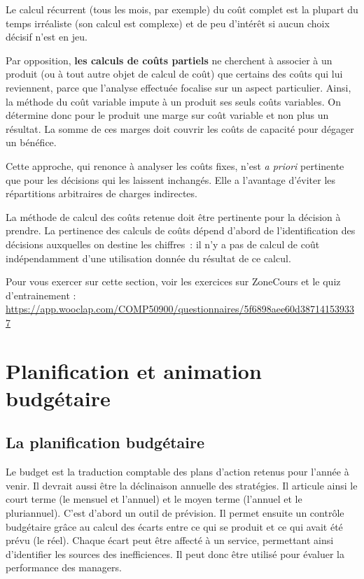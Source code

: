 \documentclass[oneside]{kaobook}
\begin{document}
Le calcul récurrent (tous les mois, par exemple) du coût complet est la plupart du temps irréaliste (son calcul est complexe) et de peu d'intérêt si aucun choix décisif n'est en jeu.

Par opposition, \textbf{les calculs de coûts partiels} ne cherchent à associer à un produit (ou à tout autre objet de calcul de coût) que certains des coûts qui lui reviennent, parce que l'analyse effectuée focalise sur un aspect particulier. Ainsi, la méthode du coût variable impute à un produit ses seuls coûts variables. On détermine donc pour le produit une marge sur coût variable et non plus un résultat. La somme de ces marges doit couvrir les coûts de capacité pour dégager un bénéfice.

Cette approche, qui renonce à analyser les coûts fixes, n'est \emph{a priori} pertinente que pour les décisions qui les laissent inchangés. Elle a l'avantage d'éviter les répartitions arbitraires de charges indirectes.

\begin{kaowarn}
La méthode de calcul des coûts retenue doit être pertinente pour la décision à prendre. La pertinence des calculs de coûts dépend d'abord de l'identification des décisions auxquelles on destine les chiffres : il n'y a pas de calcul de coût indépendamment d'une utilisation donnée du résultat de ce calcul.
\end{kaowarn}

\begin{kaobox}
Pour vous exercer sur cette section, voir les exercices sur ZoneCours et le quiz d'entrainement : \url{https://app.wooclap.com/COMP50900/questionnaires/5f6898aee60d387141539337}
\end{kaobox}

\chapter{Planification et animation budgétaire}
\label{sec:org8135c73}
\section{La planification budgétaire}
\label{sec:orge6d09b5}
Le budget est la traduction comptable des plans d'action retenus pour l'année à venir. Il devrait aussi être la déclinaison annuelle des stratégies. Il articule ainsi le court terme (le mensuel et l'annuel) et le moyen terme (l'annuel et le pluriannuel). C'est d'abord un outil de prévision. 
Il permet ensuite un contrôle budgétaire grâce au calcul des écarts entre ce qui se produit et ce qui avait été prévu (le réel). Chaque écart peut être affecté à un service, permettant ainsi d'identifier les sources des inefficiences. Il peut donc être utilisé pour évaluer la performance des managers. 
\end{document}
